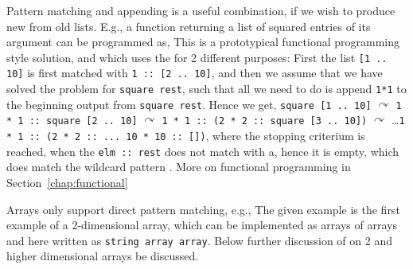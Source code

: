 Pattern matching and appending is a useful combination, if we wish to produce new from old lists. E.g., a function returning a list of squared entries of its argument can be programmed as,
%
%
This is a prototypical functional programming style solution, and which uses the \lexeme{::} for 2 different purposes: First the list \lstinline![1 .. 10]! is first matched with \lstinline!1 :: [2 .. 10]!, and then we assume that we have solved the problem for \lstinline!square rest!, such that all we need to do is append \lstinline!1*1! to the beginning output from \lstinline!square rest!. Hence we get, \lstinline!square [1 .. 10]! $\curvearrowright$ \lstinline!1 * 1 :: square [2 .. 10]! $\curvearrowright$ \lstinline!1 * 1 :: (2 * 2 :: square [3 .. 10])! $\curvearrowright$ \dots \lstinline!1 * 1 :: (2 * 2 :: ... 10 * 10 :: [])!, where the stopping criterium is reached, when the \lstinline!elm :: rest! does not match with a, hence it is empty, which does match the wildcard pattern \lexeme{_}. More on functional programming in Section~\ref{chap:functional}


Arrays only support direct pattern matching, e.g.,
%
%
The given example is the first example of a 2-dimensional array, which can be implemented as arrays of arrays and here written as \lstinline!string array array!. Below further discussion of on 2 and higher dimensional arrays be discussed.  

